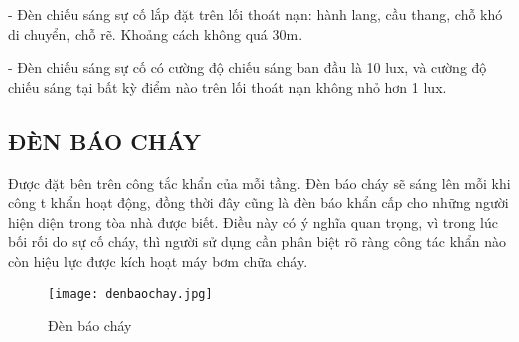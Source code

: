 - Đèn chiếu sáng sự cố lắp đặt trên lối thoát nạn: hành lang, cầu thang, chỗ khó di chuyển, chỗ rẽ. Khoảng cách không quá 30m.

- Đèn chiếu sáng sự cố có cường độ chiếu sáng ban đầu là 10 lux, và cường độ chiếu sáng tại bất kỳ điểm nào trên lối thoát nạn không nhỏ hơn 1 lux.

\subsection{ĐÈN BÁO CHÁY}
Được đặt bên trên công tắc khẩn của mỗi tầng. Đèn báo cháy sẽ sáng lên mỗi khi công t khẩn hoạt động, đồng thời đây cũng là đèn báo khẩn cấp cho những người hiện diện trong tòa nhà được biết. Điều này có ý nghĩa quan trọng, vì trong lúc bối rối do sự cố cháy, thì người sử dụng cần phân biệt rõ ràng công tác khẩn nào còn hiệu lực được kích hoạt máy bơm chữa cháy.
\begin{figure}[H]
	\centering
	\texttt{[image: denbaochay.jpg]}
	\caption{Đèn báo cháy}
\end{figure}




